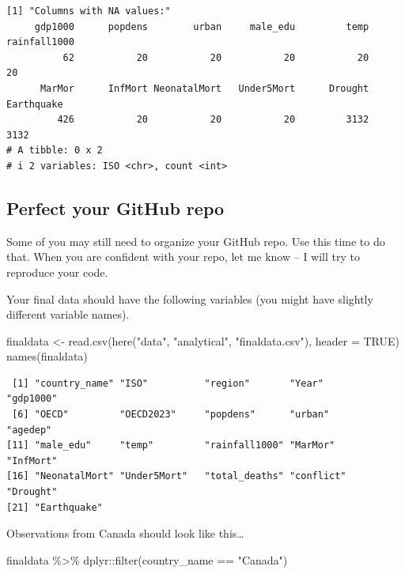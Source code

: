 \documentclass[
  letterpaper,
  DIV=11,
  numbers=noendperiod]{scrartcl}
\newenvironment{Shaded}{\begin{snugshade}}{\end{snugshade}}
\newcommand{\AttributeTok}[1]{\textcolor[rgb]{0.40,0.45,0.13}{#1}}
\newcommand{\ConstantTok}[1]{\textcolor[rgb]{0.56,0.35,0.01}{#1}}
\newcommand{\FunctionTok}[1]{\textcolor[rgb]{0.28,0.35,0.67}{#1}}
\newcommand{\NormalTok}[1]{\textcolor[rgb]{0.00,0.23,0.31}{#1}}
\newcommand{\OtherTok}[1]{\textcolor[rgb]{0.00,0.23,0.31}{#1}}
\newcommand{\SpecialCharTok}[1]{\textcolor[rgb]{0.37,0.37,0.37}{#1}}
\newcommand{\StringTok}[1]{\textcolor[rgb]{0.13,0.47,0.30}{#1}}
\begin{document}
\begin{verbatim}
[1] "Columns with NA values:"
     gdp1000      popdens        urban     male_edu         temp rainfall1000 
          62           20           20           20           20           20 
      MarMor      InfMort NeonatalMort   Under5Mort      Drought   Earthquake 
         426           20           20           20         3132         3132 
# A tibble: 0 x 2
# i 2 variables: ISO <chr>, count <int>
\end{verbatim}

\subsection{Perfect your GitHub repo}\label{perfect-your-github-repo}

Some of you may still need to organize your GitHub repo. Use this time
to do that. When you are confident with your repo, let me know -- I will
try to reproduce your code.

Your final data should have the following variables (you might have
slightly different variable names).

\begin{Shaded}
\begin{Highlighting}[]
\NormalTok{finaldata }\OtherTok{\textless{}{-}} \FunctionTok{read.csv}\NormalTok{(}\FunctionTok{here}\NormalTok{(}\StringTok{"data"}\NormalTok{, }\StringTok{"analytical"}\NormalTok{, }\StringTok{"finaldata.csv"}\NormalTok{), }\AttributeTok{header =} \ConstantTok{TRUE}\NormalTok{)}
\FunctionTok{names}\NormalTok{(finaldata)}
\end{Highlighting}
\end{Shaded}

\begin{verbatim}
 [1] "country_name" "ISO"          "region"       "Year"         "gdp1000"     
 [6] "OECD"         "OECD2023"     "popdens"      "urban"        "agedep"      
[11] "male_edu"     "temp"         "rainfall1000" "MarMor"       "InfMort"     
[16] "NeonatalMort" "Under5Mort"   "total_deaths" "conflict"     "Drought"     
[21] "Earthquake"  
\end{verbatim}

Observations from Canada should look like this\ldots{}

\begin{Shaded}
\begin{Highlighting}[]
\NormalTok{finaldata }\SpecialCharTok{\%\textgreater{}\%}
\NormalTok{  dplyr}\SpecialCharTok{::}\FunctionTok{filter}\NormalTok{(country\_name }\SpecialCharTok{==} \StringTok{"Canada"}\NormalTok{)}
\end{Highlighting}
\end{Shaded}
\end{document}
